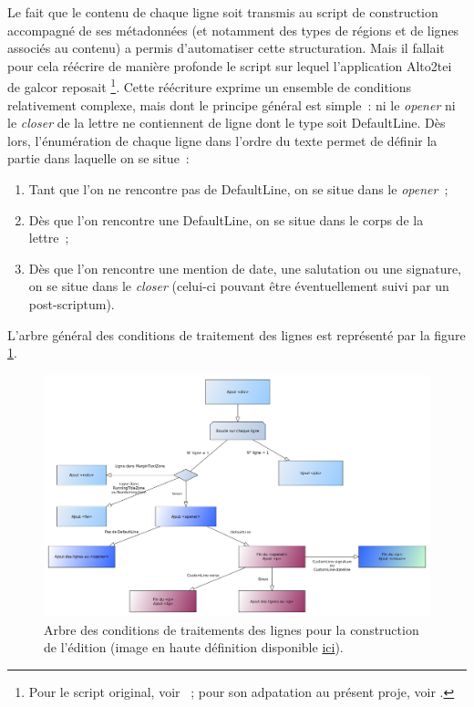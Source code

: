 \documentclass[a4paper,12pt,twoside]{book}
\begin{document}
			Le fait que le contenu de chaque ligne soit transmis au script de construction accompagné de ses métadonnées (et notamment des types de régions et de lignes associés au contenu) a permis d'automatiser cette structuration. Mais il fallait pour cela réécrire de manière profonde le script sur lequel l'application Alto2tei de \gls{galcor} reposait%
			\footnote{Pour le script original, voir \cite{christensenBodyBuildPy2022}~; pour son adpatation au présent proje, voir \cite{biayBuildBodyPy2022}.}.
			Cette réécriture exprime un ensemble de conditions relativement complexe, mais dont le principe général est simple~: ni le \textit{opener} ni le \textit{closer} de la lettre ne contiennent de ligne dont le type soit \textsf{DefaultLine}. Dès lors, l'énumération de chaque ligne dans l'ordre du texte permet de définir la partie dans laquelle on se situe~:
			
			\begin{enumerate}
				\item Tant que l'on ne rencontre pas de \textsf{DefaultLine}, on se situe dans le \textit{opener}~;
				\item Dès que l'on rencontre une \textsf{DefaultLine}, on se situe dans le corps de la lettre~;
				\item Dès que l'on rencontre une mention de date, une salutation ou une signature, on se situe dans le \textit{closer} (celui-ci pouvant être éventuellement suivi par un post-scriptum).
			\end{enumerate}
		
			L'arbre général des conditions de traitement des lignes est représenté par la figure \ref{cond-body}.
			
			\begin{figure}[!h]
				\centering
				\includegraphics[width=15cm]{schema/build-body.png}
				\caption{Arbre des conditions de traitements des lignes pour la construction de l'édition (image en haute définition disponible \href{https://raw.githubusercontent.com/sbiay/CdS-edition/main/rapportBiay/schema/build-body.svg}{ici}).}
				\label{cond-body}
			\end{figure}
		
\end{document}
